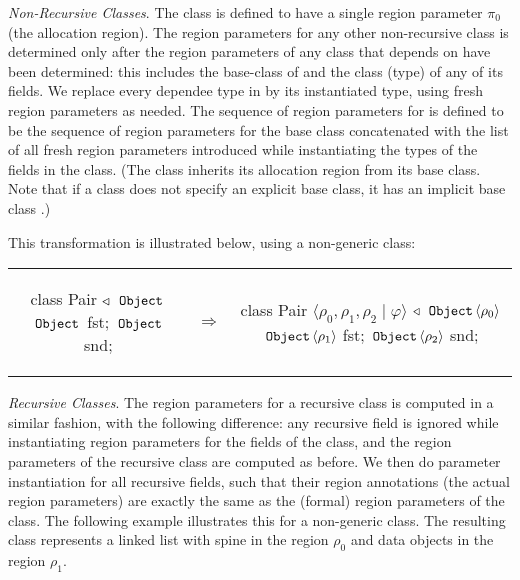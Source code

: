 \emph{Non-Recursive Classes}.
The class  is defined to have a single region parameter $\pi_0$ (the allocation region).
The region parameters for any other non-recursive class  is determined
only after the region parameters of any class that  depends on have been
determined: this includes the base-class  of  and the class (type)
of any of its fields.
We replace every dependee type  in  by its instantiated type,
using fresh region parameters as needed.
The sequence of region parameters for  is defined to be
the sequence of region parameters for the base class  concatenated
with the list of all  fresh region parameters introduced while instantiating the types
of the fields in the class.
(The class inherits its allocation region from its base class. Note that if
a class does not specify an explicit base class, it has an implicit base class
.)

This transformation is illustrated below, using a non-generic  class:

\begin{tabular}{ccc}
\begin{minipage}{0.28\linewidth}
\begin{codejava}
class Pair
  $\triangleleft$ $\,{\tt Object}\,$
{
  $\,{\tt Object}\,$ fst;
  $\,{\tt Object}\,$ snd;
}
\end{codejava}
\end{minipage}
&
$\Rightarrow$
&
\begin{minipage}{0.5\linewidth}
\begin{codejava}
class Pair $\langle \rho_0, \rho_1, \rho_2 \; | \; \varphi \rangle$
  $\triangleleft$ $\,{\tt Object}\, \langle \rho_0 \rangle$
{
  $\,{\tt Object}\, \langle \rho_1 \rangle$ fst;
  $\,{\tt Object}\, \langle \rho_2 \rangle$ snd;
}
\end{codejava}
\end{minipage}
\end{tabular}

\emph{Recursive Classes}.
The region parameters for a recursive class is computed in
a similar fashion, with the following difference: any recursive
field is ignored while instantiating region parameters for the fields of
the class, and the region parameters of the recursive class are computed
as before. We then do parameter instantiation for all recursive fields,
such that their region annotations (the actual region parameters) are
exactly the same as the (formal) region parameters of the class.
The following example illustrates this for a non-generic  class.
The resulting class represents a linked list with spine in the region
$\rho_0$ and data objects in the region $\rho_1$.

